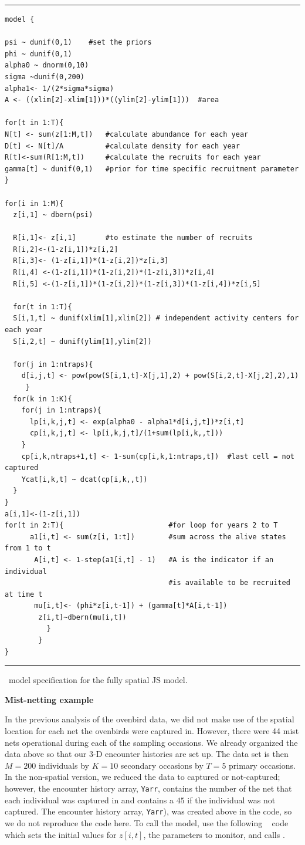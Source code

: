 \begin{panel}[htp]
\centering
\rule[0.1in]{\textwidth}{.03in}
{\small
\begin{verbatim}
model {

psi ~ dunif(0,1)    #set the priors
phi ~ dunif(0,1)
alpha0 ~ dnorm(0,10)
sigma ~dunif(0,200)
alpha1<- 1/(2*sigma*sigma)
A <- ((xlim[2]-xlim[1]))*((ylim[2]-ylim[1]))  #area

for(t in 1:T){
N[t] <- sum(z[1:M,t])   #calculate abundance for each year
D[t] <- N[t]/A			#calculate density for each year
R[t]<-sum(R[1:M,t])	    #calculate the recruits for each year
gamma[t] ~ dunif(0,1)   #prior for time specific recruitment parameter
}

for(i in 1:M){
  z[i,1] ~ dbern(psi)
  
  R[i,1]<- z[i,1]       #to estimate the number of recruits
  R[i,2]<-(1-z[i,1])*z[i,2]
  R[i,3]<- (1-z[i,1])*(1-z[i,2])*z[i,3]
  R[i,4] <-(1-z[i,1])*(1-z[i,2])*(1-z[i,3])*z[i,4]
  R[i,5] <-(1-z[i,1])*(1-z[i,2])*(1-z[i,3])*(1-z[i,4])*z[i,5]

  for(t in 1:T){
  S[i,1,t] ~ dunif(xlim[1],xlim[2]) # independent activity centers for each year
  S[i,2,t] ~ dunif(ylim[1],ylim[2])

  for(j in 1:ntraps){
    d[i,j,t] <- pow(pow(S[i,1,t]-X[j,1],2) + pow(S[i,2,t]-X[j,2],2),1)
     }
  for(k in 1:K){
    for(j in 1:ntraps){
      lp[i,k,j,t] <- exp(alpha0 - alpha1*d[i,j,t])*z[i,t]
      cp[i,k,j,t] <- lp[i,k,j,t]/(1+sum(lp[i,k,,t]))
    }
    cp[i,k,ntraps+1,t] <- 1-sum(cp[i,k,1:ntraps,t])  #last cell = not captured
    Ycat[i,k,t] ~ dcat(cp[i,k,,t])
  }
}
a[i,1]<-(1-z[i,1])
for(t in 2:T){                         #for loop for years 2 to T
      a1[i,t] <- sum(z[i, 1:t])        #sum across the alive states from 1 to t
       A[i,t] <- 1-step(a1[i,t] - 1)   #A is the indicator if an individual 
									   #is available to be recruited at time t
       mu[i,t]<- (phi*z[i,t-1]) + (gamma[t]*A[i,t-1])
        z[i,t]~dbern(mu[i,t])
          }
        }
}
\end{verbatim}
}

\rule[-0.1in]{\textwidth}{.03in}
\caption{
\jags~model specification for the fully spatial JS model.}
\label{open.panel.spatialJS}
\end{panel}


{\bf Mist-netting example}

In the previous
analysis of the ovenbird data,
we did not make use of the spatial location for each net the ovenbirds were captured in.
However, there were 44 mist nets operational during
each of the sampling occasions.  We already organized the data above so that our 3-D encounter
histories are set up.  The data set is then $M=200$ individuals by $K=10$ secondary occasions
by $T=5$ primary occasions.  In the non-spatial version, we reduced the data to captured or
not-captured; however, the encounter history array, \mbox{\tt Yarr}, contains the number of the net that
each individual was captured in and contains a $45$ if the individual was not captured.  The 
encounter history array, \mbox{\tt Yarr}), was created above in the code, so we do not
reproduce the code here. To call the model, use the following \R~ code which sets the initial
values for $z[i,t]$, the parameters to monitor, and calls \jags.


